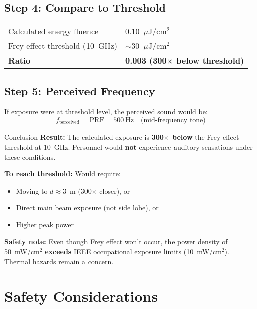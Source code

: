 \subsection*{Step 4: Compare to Threshold}

\begin{center}
\begin{tabular}{@{}ll@{}}
Calculated energy fluence & $0.10$~$\mu$J/cm$^2$ \\
Frey effect threshold (10~GHz) & $\sim$30~$\mu$J/cm$^2$ \\
\textbf{Ratio} & \textbf{0.003 (300$\times$ below threshold)} \\
\end{tabular}
\end{center}

\subsection*{Step 5: Perceived Frequency}

If exposure were at threshold level, the perceived sound would be:
\begin{equation}
f_{\text{perceived}} = \text{PRF} = 500~\text{Hz} \quad \text{(mid-frequency tone)}
\end{equation}

\begin{calloutbox}[colback=black!8!white,colframe=black]{Conclusion}
\textbf{Result:} The calculated exposure is \textbf{300$\times$ below} the Frey effect threshold at 10~GHz. Personnel would \textbf{not} experience auditory sensations under these conditions.

\textbf{To reach threshold:} Would require:
\begin{itemize}
\item Moving to $d \approx 3$~m (300$\times$ closer), or
\item Direct main beam exposure (not side lobe), or
\item Higher peak power
\end{itemize}

\textbf{Safety note:} Even though Frey effect won't occur, the power density of 50~mW/cm$^2$ \textbf{exceeds} IEEE occupational exposure limits (10~mW/cm$^2$). Thermal hazards remain a concern.
\end{calloutbox}

\section{Safety Considerations}
\label{sec:frey-safety}

